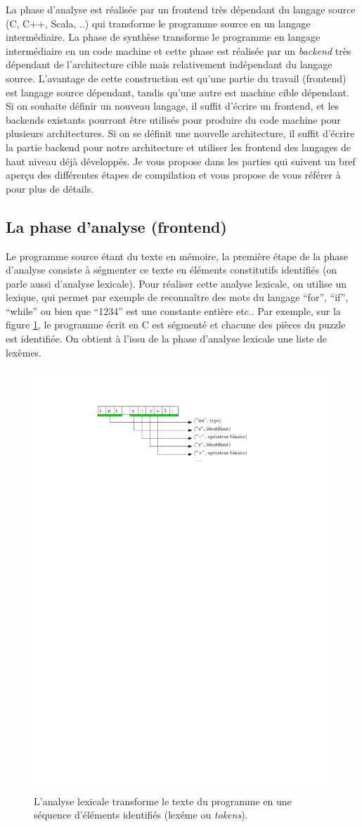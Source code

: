 La phase d'analyse est réalisée par un frontend très dépendant du langage source (C, C++, Scala, ..) qui transforme le programme source en un langage intermédiaire. La phase de synthèse transforme le programme en langage intermédiaire en un code machine et cette phase est réalisée par un \emph{backend} très dépendant de l'architecture cible mais relativement indépendant du langage source. L'avantage de cette construction est qu'une partie du travail (frontend) est langage source dépendant, tandis qu'une autre est machine cible dépendant. Si on souhaite définir un nouveau langage, il suffit d'écrire un frontend, et les backends existants pourront être utilisés pour produire du code machine pour plusieurs architectures. Si on se définit une nouvelle architecture, il suffit d'écrire la partie backend pour notre architecture et utiliser les frontend des langages de haut niveau déjà développés. Je vous propose dans les parties qui suivent un bref aperçu des différentes étapes de compilation et vous propose de vous référer à \cite{DragonBook} pour plus de détails.

\subsection{La phase d'analyse (frontend)}

Le programme source étant du texte en mémoire, la première étape de la phase d'analyse consiste à ségmenter ce texte en éléments constitutifs identifiés (on parle aussi d'analyse lexicale). Pour réaliser cette analyse lexicale, on utilise un lexique, qui permet par exemple de reconnaître des mots du langage ``for'', ``if'', ``while'' ou bien que ``1234'' est une constante entière etc.. Par exemple, sur la figure \ref{fig:lexing}, le programme écrit en C est ségmenté et chacune des pièces du puzzle est identifiée. On obtient à l'issu de la phase d'analyse lexicale une liste de lexèmes.

\begin{figure}[htbp]
\includegraphics[width=0.5\linewidth]{Figs/lexing.pdf}
\caption{\label{fig:lexing}L'analyse lexicale transforme le texte du programme en une séquence d'éléments identifiés (lexéme ou \emph{tokens}).}
\end{figure}

